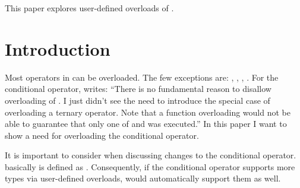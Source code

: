 \newcommand\wgTitle{Making operator?: overloadable}
\newcommand\wgName{Matthias Kretz <m.kretz@gsi.de>}
\newcommand\wgDocumentNumber{P0917R2}
\newcommand\wgGroup{EWG}
\newcommand\wgTarget{\CC{}23}

\usepackage{mymacros}
\usepackage{wg21}
\usepackage{changelog}
\usepackage{underscore}



\newcommand\simd[1][]{\type{simd#1}\xspace}
\newcommand\simdT{\type{simd<T>}\xspace}
\newcommand\valuetype{\type{value\_type}\xspace}
\newcommand\referencetype{\type{reference}\xspace}
\newcommand\whereexpression{\type{where\_expression}\xspace}
\newcommand\simdcast{\code{simd\_cast}\xspace}
\newcommand\mask[1][]{\type{simd\_mask#1}\xspace}
\newcommand\maskT{\type{simd\_mask<T>}\xspace}
\newcommand\fixedsizeN{\type{simd\_abi::fixed\_size<N>}\xspace}
\newcommand\fixedsizescoped{\type{simd\_abi::fixed\_size}\xspace}
\newcommand\fixedsize{\type{fixed\_size}\xspace}
\newcommand\simdEP{\code{execution::}\type{simd}\xspace}
\newcommand\seqEP{\code{execution::}\type{seq}\xspace}


\begin{wgTitlepage}
  This paper explores user-defined overloads of .
\end{wgTitlepage}

\pagestyle{scrheadings}
\section{Introduction}
Most operators in \CC{} can be overloaded.
The few exceptions are: , \code{::}, , .
For the conditional operator, \textcite{StrFaq} writes:
“There is no fundamental reason to disallow overloading of .
I just didn't see the need to introduce the special case of overloading a ternary operator.
Note that a function overloading  would not be able to guarantee that only one of  and  was executed.”
In this paper I want to show a need for overloading the conditional operator.

It is important to consider  when discussing changes to the conditional operator.
 basically is defined as .
Consequently, if the conditional operator supports more types via user-defined overloads,  would automatically support them as well.

